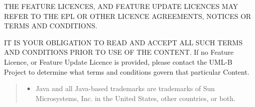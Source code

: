 THE FEATURE LICENCES, AND FEATURE UPDATE LICENCES MAY REFER
TO THE EPL OR OTHER LICENCE AGREEMENTS, NOTICES OR TERMS AND
CONDITIONS.

IT IS YOUR OBLIGATION TO READ AND ACCEPT ALL SUCH TERMS AND
CONDITIONS PRIOR TO USE OF THE CONTENT.  If no Feature
Licence, or Feature Update Licence is provided, please contact the
UML-B Project to determine what terms and conditions govern
that particular Content.
\begin{quote}
  \footnotesize

  \begin{itemize}
  \item  Java and all Java-based trademarks are trademarks of Sun
    Microsystems, Inc. in the United States, other countries, or
    both.
  \end{itemize}
\end{quote}

